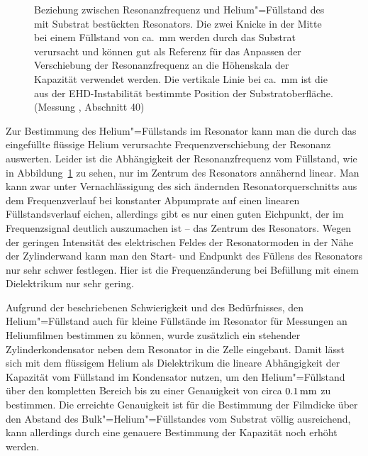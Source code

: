 \begin{figure}[h!tbp]
	\hfill
	\begin{minipage}[b]{\textwidth-\smallwidth-\tabcolsep}
		\caption[Abhängigkeit der Resonanzfrequenz vom Helium"=Füllstand]{Beziehung zwischen Resonanzfrequenz und Helium"=Füllstand des mit Substrat bestückten Resonators. Die zwei Knicke in der Mitte bei einem Füllstand von ca.\ \unit[15]{mm} werden durch das Substrat verursacht und können gut als Referenz für das Anpassen der Verschiebung der Resonanzfrequenz an die Höhenskala der Kapazität verwendet werden. Die vertikale Linie bei ca.\ \unit[16]{mm} ist die aus der EHD-Instabilität bestimmte Position der Substrat\-oberfläche. (Messung , Abschnitt 40)}
		\label{fig:level}
	\end{minipage}
\end{figure}
Zur Bestimmung des Helium"=Füllstands im Resonator kann man die durch das eingefüllte flüssige Helium verursachte Frequenzverschiebung der Resonanz auswerten. Leider ist die Abhängigkeit der Resonanzfrequenz vom Füllstand, wie in Abbildung~\ref{fig:level} zu sehen, nur im Zentrum des Resonators annähernd linear. Man kann zwar unter Vernachlässigung des sich ändernden Resonatorquerschnitts aus dem Frequenzverlauf bei konstanter Abpumprate auf einen linearen Füllstandsverlauf eichen, allerdings gibt es nur einen guten Eichpunkt, der im Frequenzsignal deutlich auszumachen ist -- das Zentrum des Resonators. Wegen der geringen Intensität des elektrischen Feldes der Resonatormoden in der Nähe der Zylinderwand kann man den Start- und Endpunkt des Füllens des Resonators nur sehr schwer festlegen. Hier ist die Frequenzänderung bei Befüllung mit einem Dielektrikum nur sehr gering.

Aufgrund der beschriebenen Schwierigkeit und des Bedürfnisses, den Helium"=Füllstand auch für kleine Füllstände im Resonator für Messungen an Heliumfilmen bestimmen zu können, wurde zusätzlich ein stehender Zylinderkondensator neben dem Resonator in die Zelle eingebaut. Damit lässt sich mit dem flüssigem Helium als Dielektrikum die lineare Abhängigkeit der Kapazität vom Füllstand im Kondensator nutzen, um den Helium"=Füllstand über den kompletten Bereich bis zu einer Genauigkeit von circa $\unit[0.1]{mm}$ zu bestimmen. Die erreichte Genauigkeit ist für die Bestimmung der Filmdicke über den Abstand des Bulk"=Helium"=Füllstandes vom Substrat völlig ausreichend, kann allerdings durch eine genauere Bestimmung der Kapazität noch erhöht werden.

